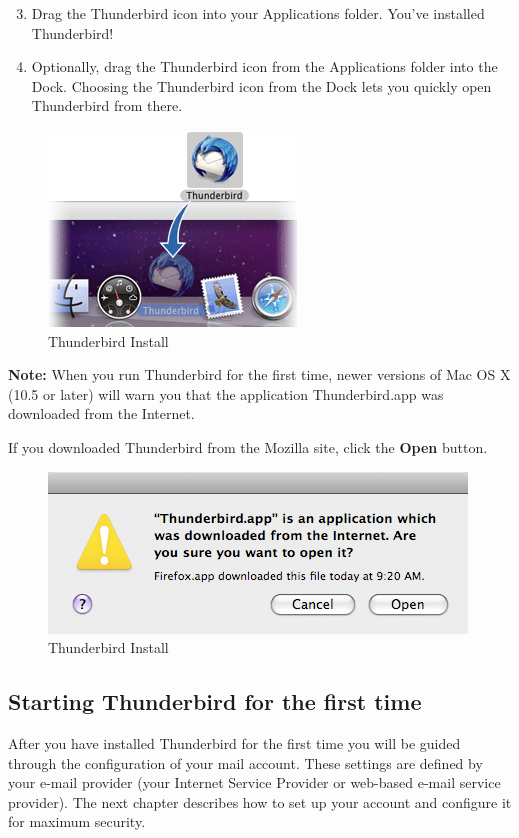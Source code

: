 \begin{enumerate}[1.]
\setcounter{enumi}{2}
\item
  Drag the Thunderbird icon into your Applications folder. You've
  installed Thunderbird!
\item
  Optionally, drag the Thunderbird icon from the Applications folder
  into the Dock. Choosing the Thunderbird icon from the Dock lets you
  quickly open Thunderbird from there.
\end{enumerate}
\begin{figure}[htbp]
\centering
\includegraphics{thunderbird_inst_mac_3.jpg}
\caption{Thunderbird Install}
\end{figure}

\textbf{Note:} When you run Thunderbird for the first time, newer
versions of Mac OS X (10.5 or later) will warn you that the application
Thunderbird.app was downloaded from the Internet.

If you downloaded Thunderbird from the Mozilla site, click the
\textbf{Open} button.

\begin{figure}[htbp]
\centering
\includegraphics{thunderbird_inst_mac_4.jpg}
\caption{Thunderbird Install}
\end{figure}

\subsection{Starting Thunderbird for the first time}

After you have installed Thunderbird for the first time you will be
guided through the configuration of your mail account. These settings
are defined by your e-mail provider (your Internet Service Provider or
web-based e-mail service provider). The next chapter describes how to
set up your account and configure it for maximum security.
